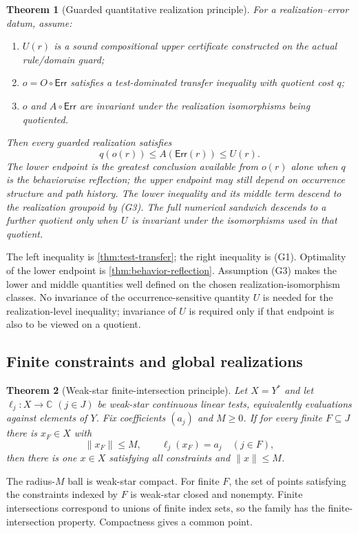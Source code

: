 \documentclass[12pt,a4paper,twoside]{extarticle}
\makeatletter
\theoremstyle{compactplain}
\newtheorem{theorem}{Theorem}[section]
\theoremstyle{compactdef}
\renewenvironment{proof}[1][\proofname]{\par\pushQED{\qed}\normalfont
  \topsep2pt\trivlist\item[\hskip\labelsep\bfseries #1\@addpunct{.}]\ignorespaces}
 {\popQED\endtrivlist\@endpefalse}
\newcommand{\Err}{\mathsf{Err}}
\makeatother
\begin{document}
\begin{theorem}[Guarded quantitative realization principle]\label{thm:guarded-bounds}
For a realization--error datum, assume:
\begin{enumerate}[label=(G\arabic*)]
\item $U(r)$ is a sound compositional upper certificate constructed on the actual rule/domain guard;
\item $o=O\circ\Err$ satisfies a test-dominated transfer inequality with quotient cost $q$;
\item $o$ and $A\circ\Err$ are invariant under the realization isomorphisms being quotiented.
\end{enumerate}
Then every guarded realization satisfies
\[
  q(o(r))\le A(\Err(r))\le U(r).
\]
The lower endpoint is the greatest conclusion available from $o(r)$ alone when $q$ is the behaviorwise reflection; the upper endpoint may still depend on occurrence structure and path history.  The lower inequality and its middle term descend to the realization groupoid by (G3).  The full numerical sandwich descends to a further quotient only when $U$ is invariant under the isomorphisms used in that quotient.
\end{theorem}
\begin{proof}
The left inequality is \cref{thm:test-transfer}; the right inequality is (G1).  Optimality of the lower endpoint is \cref{thm:behavior-reflection}.  Assumption (G3) makes the lower and middle quantities well defined on the chosen realization-isomorphism classes.  No invariance of the occurrence-sensitive quantity $U$ is needed for the realization-level inequality; invariance of $U$ is required only if that endpoint is also to be viewed on a quotient.
\end{proof}

\subsection{Finite constraints and global realizations}
\begin{theorem}[Weak-star finite-intersection principle]\label{thm:weakstar-fip}
Let $X=Y^*$ and let $\ell_j:X\to\mathbb C$ $(j\in J)$ be weak-star continuous linear tests, equivalently evaluations against elements of $Y$.  Fix coefficients $(a_j)$ and $M\ge0$.  If for every finite $F\subseteq J$ there is $x_F\in X$ with
\[
  \|x_F\|\le M,\qquad \ell_j(x_F)=a_j\quad(j\in F),
\]
then there is one $x\in X$ satisfying all constraints and $\|x\|\le M$.
\end{theorem}
\begin{proof}
The radius-$M$ ball is weak-star compact.  For finite $F$, the set of points satisfying the constraints indexed by $F$ is weak-star closed and nonempty.  Finite intersections correspond to unions of finite index sets, so the family has the finite-intersection property.  Compactness gives a common point.
\end{proof}
\end{document}
